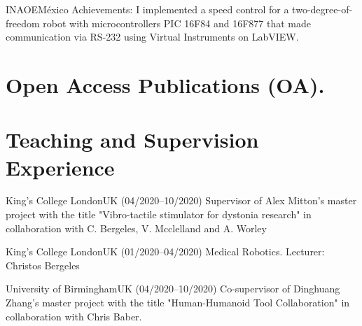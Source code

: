 \documentclass[10pt,a4paper,roman]{moderncv}
\begin{document}
{INAOE}{M\'exico}{}
{Achievements:
I implemented a speed control for a two-degree-of-freedom robot with microcontrollers
PIC 16F84 and 16F877 that made communication via RS-232 using Virtual Instruments on LabVIEW.
}



\newpage

\section{Open Access Publications (OA).
	}




\section{Teaching and Supervision Experience}

{King's College London}{UK}{}
{
(04/2020--10/2020) Supervisor of Alex Mitton's master project with the title 
"Vibro-tactile stimulator for dystonia research" in
collaboration with C. Bergeles, V. Mcclelland and A. Worley
}

{King's College London}{UK}{}
{
(01/2020--04/2020) Medical Robotics. Lecturer: Christos Bergeles
}



{University of Birmingham}{UK}{}
{
(04/2020--10/2020) Co-supervisor of Dinghuang Zhang's master project with the title 
"Human-Humanoid Tool Collaboration" in
collaboration with Chris Baber.
}
\end{document}
